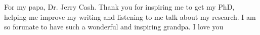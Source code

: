 For my papa, Dr. Jerry Cash.  Thank you for inspiring me to get my PhD, helping me improve my writing and listening to me talk about my research. I am so forunate to have such a wonderful and inspiring grandpa. I love you